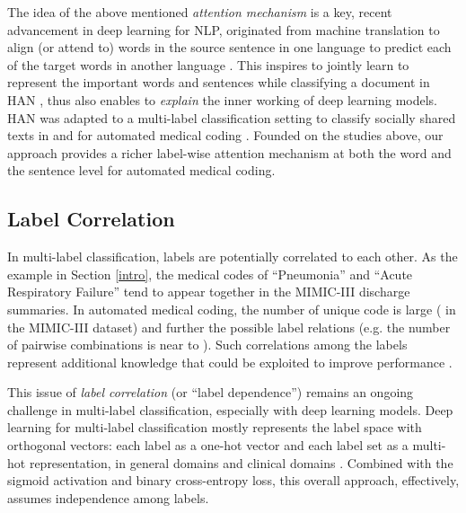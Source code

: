 \documentclass[final,5p,times,twocolumn]{elsarticle}
\begin{document}
The idea of the above mentioned \textit{attention mechanism} is a key, recent advancement in deep learning for NLP, originated from machine translation to align (or attend to) words in the source sentence in one language to predict each of the target words in another language \cite{bahdanau2014}. This inspires to jointly learn to represent the important words and sentences while classifying a document in HAN \cite{yang2016}, thus also enables to \textit{explain} the inner working of deep learning models. HAN was adapted to a multi-label classification setting to classify socially shared texts in \cite{dong2020} and for automated medical coding \cite{baumel2018multi}. Founded on the studies above, our approach provides a richer label-wise attention mechanism at both the word and the sentence level for automated medical coding.

\subsection{Label Correlation}
\label{rw:label_correlation}
In multi-label classification, labels are potentially correlated to each other. As the example in Section \ref{intro}, the medical codes of ``Pneumonia'' and ``Acute Respiratory Failure'' tend to appear together in the MIMIC-III discharge summaries. In automated medical coding, the number of unique code  is large ( in the MIMIC-III dataset) and further the possible label relations (e.g. the number of pairwise combinations is near to ). Such correlations among the labels represent additional knowledge that could be exploited to improve performance \cite{Gibaja2015}.

This issue of \textit{label correlation} (or ``label dependence'') remains an ongoing challenge \cite{Gibaja2015} in multi-label classification, especially with deep learning models. Deep learning for multi-label classification mostly represents the label space with orthogonal vectors: each label as a one-hot vector and each label set as a multi-hot representation, in general domains \cite{Nam2014} and clinical domains \cite{mullenbach-etal-2018-explainable,baumel2018multi}. Combined with the sigmoid activation and binary cross-entropy loss, this overall approach, effectively, assumes independence among labels.
\end{document}
